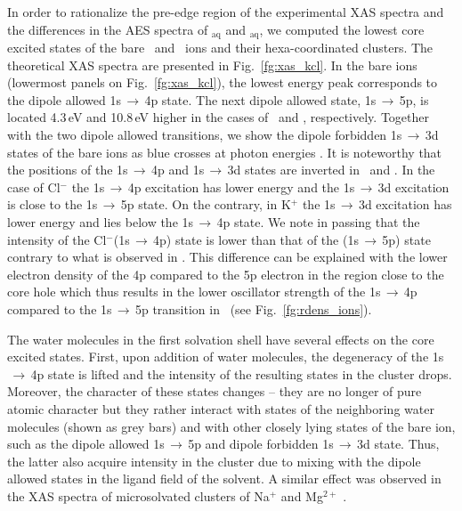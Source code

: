 In order to rationalize the pre-edge region of the experimental XAS spectra and the differences in the AES spectra of \ki$_{\text{aq}}$ and \cli$_{\text{aq}}$, we computed the lowest core excited states of the bare \ki~and \cli~ions and their hexa-coordinated clusters. The theoretical XAS spectra are presented in Fig.\ \ref{fg:xas_kcl}. In the bare ions (lowermost panels on Fig.\ \ref{fg:xas_kcl}), the lowest energy peak corresponds to the dipole allowed 1s$\,\rightarrow\,$4p state. The next dipole allowed state, 1s$\,\rightarrow\,$5p, is located 4.3\,eV and 10.8\,eV higher in the cases of \ki~and \cli, respectively. Together with the two dipole allowed transitions, we show the dipole forbidden 1s$\,\rightarrow\,$3d states of the bare ions as blue crosses at photon energies . It is noteworthy that the positions of the 1s$\,\rightarrow\,$4p and 1s$\,\rightarrow\,$3d states are inverted in \ki~and \cli. In the case of Cl$^{-}$ the 1s$\,\rightarrow\,$4p excitation has lower energy and the 1s$\,\rightarrow\,$3d excitation is close to the 1s$\,\rightarrow\,$5p state. On the contrary, in K$^{+}$ the 1s$\,\rightarrow\,$3d excitation has lower energy and lies below the 1s$\,\rightarrow\,$4p state. We note in passing that the intensity of the Cl$^{-}$(1s$\,\rightarrow\,$4p) state is lower than that of the \cli(1s$\,\rightarrow\,$5p) state contrary to what is observed in \ki. This difference can be explained with the lower electron density of the 4p compared to the 5p electron in the region close to the core hole which thus results in the lower oscillator strength of the 1s$\,\rightarrow\,$4p compared to the 1s$\,\rightarrow\,$5p transition in \cli~(see Fig.\ \ref{fg:rdens_ions}).


The water molecules in the first solvation shell have several effects on the core excited states. First, upon addition of water molecules, the degeneracy of the 1s$\,\rightarrow\,$4p state is lifted and the intensity of the resulting states in the cluster drops. Moreover, the character of these states changes -- they are no longer of pure atomic character but they rather interact with states of the neighboring water molecules (shown as grey bars) and with other closely lying states of the bare ion, such as the dipole allowed 1s$\,\rightarrow\,$5p and dipole forbidden 1s$\,\rightarrow\,$3d state. Thus, the latter also acquire intensity in the cluster due to mixing with the dipole allowed states in the ligand field of the solvent. A similar effect was observed in the XAS spectra of microsolvated clusters of Na$^{+}$ and Mg$^{2+}$ \citep{miteva16:16671}.



